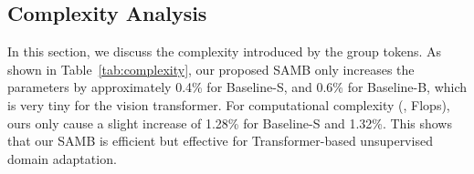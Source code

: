 \documentclass[journal]{IEEEtran}
\begin{document}
\subsection{Complexity Analysis}
\label{sec:complexity}
In this section, we discuss the complexity introduced by the group tokens. As shown in Table~\ref{tab:complexity}, our proposed SAMB only increases the parameters by approximately 0.4\% for Baseline-S, and 0.6\% for Baseline-B, which is very tiny for the vision transformer. For computational complexity (\ieno, Flops), ours only cause a slight increase of 1.28\% for Baseline-S and 1.32\%. This shows that our SAMB is efficient but effective for Transformer-based unsupervised domain adaptation.




\begin{table}[]
\caption{Complexity Analysis for our proposed SAMB.}
\label{tab:complexity}
\end{table}
\end{document}
